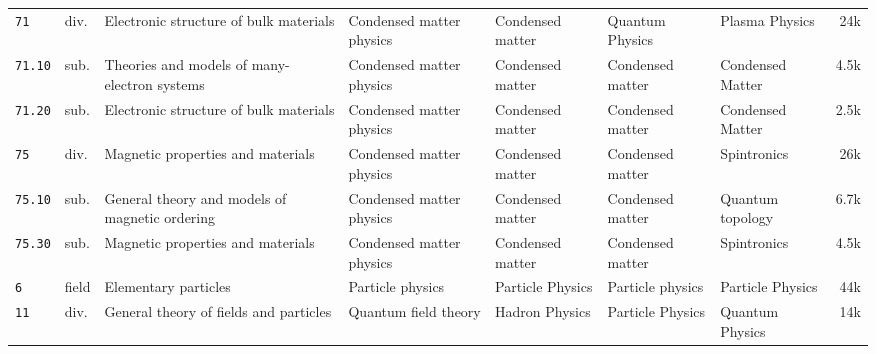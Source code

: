 \documentclass[9pt]{article}
\begin{document}
\begin{tabularx}{\linewidth}{@{}l l Y Y Y Y Y r@{}}
\texttt{71} & div. & Electronic structure of bulk materials & Condensed matter physics & Condensed matter & Quantum Physics & Plasma Physics & 24k \\
\texttt{71.10} & sub. & Theories and models of many-electron systems & Condensed matter physics & Condensed matter & Condensed matter & Condensed Matter & 4.5k \\
\texttt{71.20} & sub. & Electronic structure of bulk materials & Condensed matter physics & Condensed matter & Condensed matter & Condensed Matter & 2.5k \\
\texttt{75} & div. & Magnetic properties and materials & Condensed matter physics & Condensed matter & Condensed matter & Spintronics & 26k \\
\texttt{75.10} & sub. & General theory and models of magnetic ordering & Condensed matter physics & Condensed matter & Condensed matter & Quantum topology & 6.7k \\
\texttt{75.30} & sub. & Magnetic properties and materials & Condensed matter physics & Condensed matter & Condensed matter & Spintronics & 4.5k \\
\texttt{6} & field & Elementary particles & Particle physics & Particle Physics & Particle physics & Particle Physics & 44k \\
\texttt{11} & div. & General theory of fields and particles & Quantum field theory & Hadron Physics & Particle Physics & Quantum Physics & 14k \\

\end{tabularx}
\end{document}
